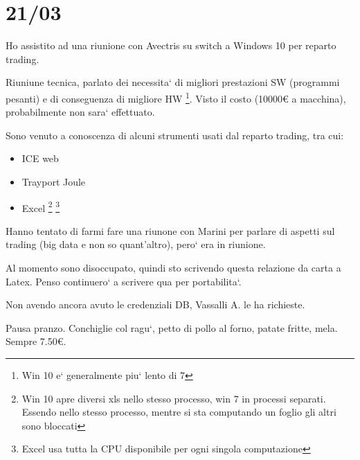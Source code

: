 \section{21/03}
    Ho assistito ad una riunione con Avectris su switch a Windows 10 per reparto trading.
    
    Riuniune tecnica, parlato dei necessita` di migliori prestazioni SW (programmi pesanti) e di conseguenza di migliore HW \footnote{Win 10 e` generalmente piu` lento di 7}.
    Visto il costo (10000\euro{} a macchina), probabilmente non sara` effettuato.
    
    Sono venuto a conoscenza di alcuni strumenti usati dal reparto trading, tra cui:
    \begin{itemize}
        \item ICE web
        \item Trayport Joule
        \item Excel \footnote{Win 10 apre diversi xls nello stesso processo, win 7 in processi separati. Essendo nello stesso processo, mentre si sta computando un foglio gli altri sono bloccati} \footnote{Excel usa tutta la CPU disponibile per ogni singola computazione}
    \end{itemize}
    
    Hanno tentato di farmi fare una riunone con Marini per parlare di aspetti sul trading (big data e non so quant'altro), pero` era in riunione.
    
    Al momento sono disoccupato, quindi sto scrivendo questa relazione da carta a Latex. Penso continuero` a scrivere qua per portabilita`.
    
    Non avendo ancora avuto le credenziali DB, Vassalli A. le ha richieste.
    
    Pausa pranzo.
    Conchiglie col ragu`, petto di pollo al forno, patate fritte, mela. Sempre 7.50\euro{}.